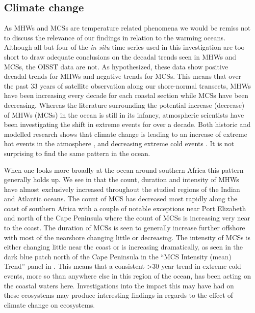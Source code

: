 \documentclass[a4paper,10pt,review]{elsarticle}
\begin{document}
\subsection{Climate change}
As MHWs and MCSs are temperature related phenomena we would be remiss not to discuss the relevance of our findings in relation to the warming oceans. Although all but four of the \emph{in situ} time series used in this investigation are too short to draw adequate conclusions on the decadal trends seen in MHWs and MCSs, the OISST data are not. As hypothesized, these data show positive decadal trends for MHWs and negative trends for MCSs. This means that over the past 33 years of satellite observation along our shore-normal transects, MHWs have been increasing every decade for each coastal section while MCSs have been decreasing. Whereas the literature surrounding the potential increase (decrease) of MHWs (MCSs) in the ocean is still in its infancy, atmospheric scientists have been investigating the shift in extreme events for over a decade. Both historic and modelled research shows that climate change is leading to an increase of extreme hot events in the atmosphere \citep{Easterling2000, Perkins2013}, and decreasing extreme cold events \citep{Meehl2004}. It is not surprising to find the same pattern in the ocean.

When one looks more broadly at the ocean around southern Africa this pattern generally holds up. We see in  that the count, duration and intensity of MHWs have almost exclusively increased throughout the studied regions of the Indian and Atlantic oceans. The count of MCS has decreased most rapidly along the coast of southern Africa with a couple of notable exceptions near Port Elizabeth and north of the Cape Peninsula where the count of MCSs is increasing very near to the coast. The duration of MCSs is seen to generally increase further offshore with most of the nearshore changing little or decreasing. The intensity of MCSs is either changing little near the coast or is increasing dramatically, as seen in the dark blue patch north of the Cape Peninsula in the ``MCS Intensity (mean) Trend'' panel in . This means that a consistent >30 year trend in extreme cold events, more so than anywhere else in this region of the ocean, has been acting on the coastal waters here. Investigations into the impact this may have had on these ecosystems may produce interesting findings in regards to the effect of climate change on ecosystems.
\end{document}
